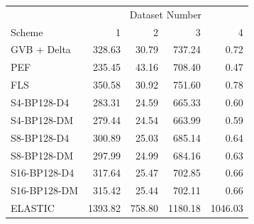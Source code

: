 \begin{tabular}{lrrrr}
\toprule
 & \multicolumn{4}{c}{Dataset Number} \\
Scheme & 1 & 2 & 3 & 4 \\
\midrule
GVB + Delta & 328.63 & 30.79 & 737.24 & 0.72 \\
PEF & 235.45 & 43.16 & 708.40 & 0.47 \\
FLS & 350.58 & 30.92 & 751.60 & 0.78 \\
S4-BP128-D4 & 283.31 & 24.59 & 665.33 & 0.60 \\
S4-BP128-DM & 279.44 & 24.54 & 663.99 & 0.59 \\
S8-BP128-D4 & 300.89 & 25.03 & 685.14 & 0.64 \\
S8-BP128-DM & 297.99 & 24.99 & 684.16 & 0.63 \\
S16-BP128-D4 & 317.64 & 25.47 & 702.85 & 0.66 \\
S16-BP128-DM & 315.42 & 25.44 & 702.11 & 0.66 \\
ELASTIC & 1393.82 & 758.80 & 1180.18 & 1046.03 \\
\bottomrule
\end{tabular}
